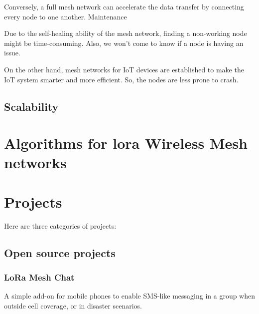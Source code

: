 			Conversely, a full mesh network can accelerate the data transfer by connecting every node to one another.
			Maintenance
			
			Due to the self-healing ability of the mesh network, finding a non-working node might be time-consuming. Also, we won’t come to know if a node is having an issue.
			
			On the other hand, mesh networks for IoT devices are established to make the IoT system smarter and more efficient. So, the nodes are less prone to crash.
	
		\subsection{Scalability}
		
			
			
	
	\section{Algorithms for lora Wireless Mesh networks}
	
	
	\section{Projects}
		
		Here are three categories of projects:
		
		\subsection{Open source projects}
		
			\subsubsection{LoRa Mesh Chat}
			
				A simple add-on for mobile phones to enable SMS-like messaging in a group when outside cell coverage, or in disaster scenarios.
				

